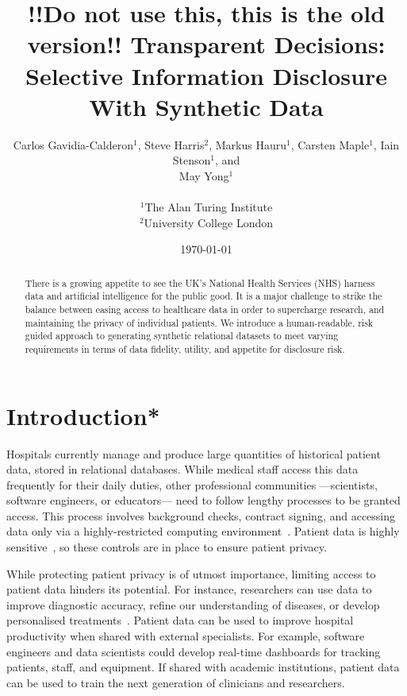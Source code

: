 \documentclass[11pt]{article}
\begin{document}
\title{!!Do not use this, this is the old version!! Transparent Decisions: Selective Information Disclosure With Synthetic Data}
\author{
Carlos Gavidia-Calderon$^1$, Steve Harris$^2$, Markus Hauru$^1$, Carsten Maple$^1$, Iain Stenson$^1$, and \\ May Yong$^1$ \\~\\
$^1$The Alan Turing Institute \\
$^2$University College London
}
\date{\today} %
\maketitle
\begin{abstract}
There is a growing appetite to see the UK's National Health Services (NHS) harness data and artificial intelligence for the public good. It is a major challenge to strike the balance between easing access to healthcare data in order to supercharge research, and maintaining the privacy of individual patients. We introduce a human-readable, risk guided approach to generating synthetic relational datasets to meet varying requirements in terms of data fidelity, utility, and appetite for disclosure risk.
\end{abstract}

\section{Introduction*}

Hospitals currently manage and produce large quantities of historical
patient data, stored in relational databases. While medical staff access this data frequently for their daily duties,
other professional communities ---scientists, software engineers, or educators--- need to follow lengthy processes to be granted access.
This process involves background checks, contract signing, and 
accessing data only via a highly-restricted computing environment~\cite{harris2022}.
Patient data is highly sensitive~\cite{schomerus2022}, so these controls are in place to ensure patient privacy.

While protecting patient privacy is of utmost importance, limiting access to 
patient data hinders its potential.
For instance, researchers can use data to improve diagnostic accuracy, refine our understanding of diseases, or develop personalised
treatments~\cite{tucker2020}.
Patient data can be used to improve hospital productivity when shared
with external specialists.
For example, software engineers and data scientists could develop real-time dashboards 
for tracking patients, staff, and equipment.
If shared with academic institutions, patient data can be used to train the next generation of clinicians and researchers.
\end{document}
